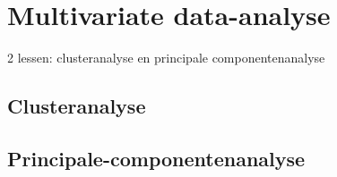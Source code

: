 \chapter{Multivariate data-analyse}
2 lessen: clusteranalyse en principale componentenanalyse

\section{Clusteranalyse}

\section{Principale-componentenanalyse}
